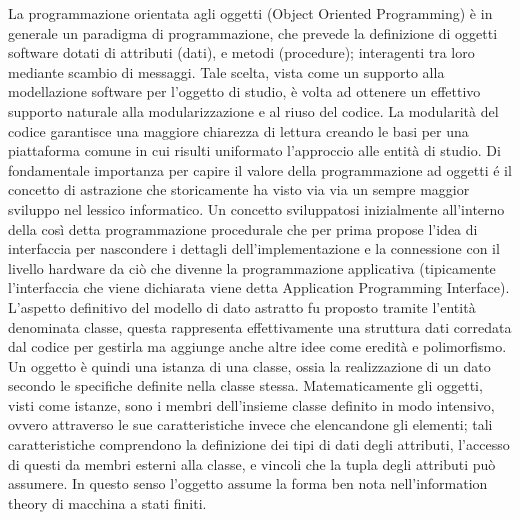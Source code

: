 La programmazione orientata agli oggetti (Object Oriented Programming) è
in generale un paradigma di programmazione, che prevede la definizione
di oggetti software dotati di attributi (dati), e metodi (procedure);
interagenti tra loro mediante scambio di messaggi. Tale scelta, vista
come un supporto alla modellazione software per l'oggetto di studio, è
volta ad ottenere un effettivo supporto naturale alla modularizzazione e
al riuso del codice. La modularità del codice garantisce una maggiore
chiarezza di lettura creando le basi per una piattaforma comune in cui
risulti uniformato l'approccio alle entità di studio.  Di fondamentale
importanza per capire il valore della programmazione ad oggetti é il
concetto di astrazione che storicamente ha visto via via un sempre
maggior sviluppo nel lessico informatico. Un concetto sviluppatosi
inizialmente all'interno della così detta programmazione procedurale che
per prima propose l'idea di interfaccia per nascondere i dettagli
dell'implementazione e la connessione con il livello hardware da ciò che
divenne la programmazione applicativa (tipicamente l'interfaccia che
viene dichiarata viene detta Application Programming
Interface). L'aspetto definitivo del modello di dato astratto fu
proposto tramite l'entità denominata classe, questa rappresenta
effettivamente una struttura dati corredata dal codice per gestirla ma
aggiunge anche altre idee come eredità e polimorfismo. Un oggetto è
quindi una istanza di una classe, ossia la realizzazione di un dato
secondo le specifiche definite nella classe stessa. Matematicamente gli
oggetti, visti come istanze, sono i membri dell'insieme classe definito
in modo intensivo, ovvero attraverso le sue caratteristiche invece che
elencandone gli elementi; tali caratteristiche comprendono la
definizione dei tipi di dati degli attributi, l'accesso di questi da
membri esterni alla classe, e vincoli che la tupla degli attributi può
assumere. In questo senso l'oggetto assume la forma ben nota
nell'information theory di macchina a stati finiti.

